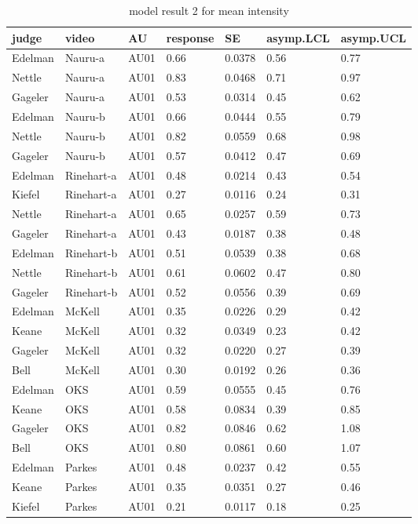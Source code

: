 \documentclass{monashthesis}
\begin{document}
\begin{center}
\begin{longtable}{lllllll}
\caption{model result 2 for mean intensity}\\
\toprule
judge & video & AU & response & SE & asymp.LCL & asymp.UCL \\
\midrule
\endhead
\bottomrule
\endfoot
Edelman & Nauru-a & AU01 & 0.66 & 0.0378 & 0.56 & 0.77 \\
Nettle & Nauru-a & AU01 & 0.83 & 0.0468 & 0.71 & 0.97 \\
Gageler & Nauru-a & AU01 & 0.53 & 0.0314 & 0.45 & 0.62 \\
Edelman & Nauru-b & AU01 & 0.66 & 0.0444 & 0.55 & 0.79 \\
Nettle & Nauru-b & AU01 & 0.82 & 0.0559 & 0.68 & 0.98 \\
Gageler & Nauru-b & AU01 & 0.57 & 0.0412 & 0.47 & 0.69 \\
Edelman & Rinehart-a & AU01 & 0.48 & 0.0214 & 0.43 & 0.54 \\
Kiefel & Rinehart-a & AU01 & 0.27 & 0.0116 & 0.24 & 0.31 \\
Nettle & Rinehart-a & AU01 & 0.65 & 0.0257 & 0.59 & 0.73 \\
Gageler & Rinehart-a & AU01 & 0.43 & 0.0187 & 0.38 & 0.48 \\
Edelman & Rinehart-b & AU01 & 0.51 & 0.0539 & 0.38 & 0.68 \\
Nettle & Rinehart-b & AU01 & 0.61 & 0.0602 & 0.47 & 0.80 \\
Gageler & Rinehart-b & AU01 & 0.52 & 0.0556 & 0.39 & 0.69 \\
Edelman & McKell & AU01 & 0.35 & 0.0226 & 0.29 & 0.42 \\
Keane & McKell & AU01 & 0.32 & 0.0349 & 0.23 & 0.42 \\
Gageler & McKell & AU01 & 0.32 & 0.0220 & 0.27 & 0.39 \\
Bell & McKell & AU01 & 0.30 & 0.0192 & 0.26 & 0.36 \\
Edelman & OKS & AU01 & 0.59 & 0.0555 & 0.45 & 0.76 \\
Keane & OKS & AU01 & 0.58 & 0.0834 & 0.39 & 0.85 \\
Gageler & OKS & AU01 & 0.82 & 0.0846 & 0.62 & 1.08 \\
Bell & OKS & AU01 & 0.80 & 0.0861 & 0.60 & 1.07 \\
Edelman & Parkes & AU01 & 0.48 & 0.0237 & 0.42 & 0.55 \\
Keane & Parkes & AU01 & 0.35 & 0.0351 & 0.27 & 0.46 \\
Kiefel & Parkes & AU01 & 0.21 & 0.0117 & 0.18 & 0.25 \\

\end{longtable}
\end{center}
\end{document}
